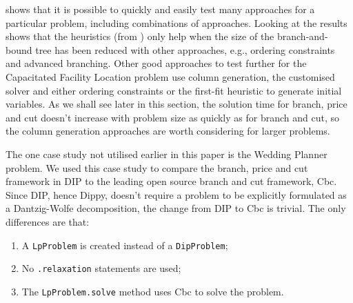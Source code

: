  shows that it is possible to quickly and easily test many approaches for a particular problem, including combinations of approaches. Looking at the results shows that the heuristics (from ) only help when the size of the branch-and-bound tree has been reduced with other approaches, e.g., ordering constraints and advanced branching. Other good approaches to test further for the Capacitated Facility Location problem use column generation, the customised solver and either ordering constraints or the first-fit heuristic to generate initial variables. As we shall see later in this section, the solution time for branch, price and cut doesn't increase with problem size as quickly as for branch and cut, so the column generation approaches are worth considering for larger problems.

The one case study not utilised earlier in this paper is the Wedding Planner problem. We used this case study to compare the branch, price and cut framework in \ac{DIP} to the leading open source branch and cut framework, Cbc. Since \ac{DIP}, hence Dippy, doesn't require a problem to be explicitly formulated as a Dantzig-Wolfe decomposition, the change from \ac{DIP} to Cbc is trivial. The only differences are that:
\begin{enumerate}
\item A \texttt{LpProblem} is created instead of a \texttt{DipProblem};
\item No \texttt{.relaxation} statements are used;
\item The \texttt{LpProblem.solve} method uses Cbc to solve the problem.
\end{enumerate}

